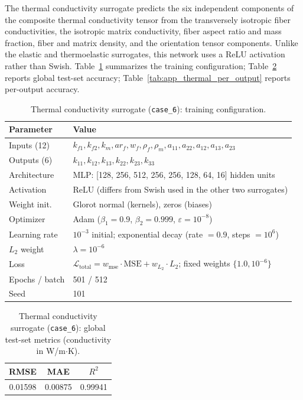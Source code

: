 \documentclass[preprint,review,10pt,number]{elsarticle}
\begin{document}
The thermal conductivity surrogate predicts the six independent components of the composite thermal conductivity tensor from the transversely isotropic fiber conductivities, the isotropic matrix conductivity, fiber aspect ratio and mass fraction, fiber and matrix density, and the orientation tensor components. Unlike the elastic and thermoelastic surrogates, this network uses a ReLU activation rather than Swish. Table~\ref{tab:app_thermal_config} summarizes the training configuration; Table~\ref{tab:app_thermal_global} reports global test-set accuracy; Table~\ref{tab:app_thermal_per_output} reports per-output accuracy.

\begin{table}[h]
\centering
\caption{Thermal conductivity surrogate (\texttt{case\_6}): training configuration.}
\label{tab:app_thermal_config}
\begin{tabular}{ll}
\toprule
Parameter & Value \\
\midrule
Inputs (12)     & $k_{f1}, k_{f2}, k_m, ar_f, w_f, \rho_f, \rho_m, a_{11}, a_{22}, a_{12}, a_{13}, a_{23}$ \\
Outputs (6)     & $k_{11}, k_{12}, k_{13}, k_{22}, k_{23}, k_{33}$ \\
Architecture    & MLP: [128, 256, 512, 256, 256, 128, 64, 16] hidden units \\
Activation      & ReLU (differs from Swish used in the other two surrogates) \\
Weight init.    & Glorot normal (kernels), zeros (biases) \\
Optimizer       & Adam ($\beta_1 = 0.9$, $\beta_2 = 0.999$, $\varepsilon = 10^{-8}$) \\
Learning rate   & $10^{-3}$ initial; exponential decay (rate $= 0.9$, steps $= 10^{6}$) \\
$L_2$ weight    & $\lambda = 10^{-6}$ \\
Loss            & $\mathcal{L}_{\text{total}} = w_{\text{mse}} \cdot \text{MSE} + w_{L_2} \cdot L_2$; fixed weights $\{1.0, 10^{-6}\}$ \\
Epochs / batch  & 501 / 512 \\
Seed            & 101 \\
\bottomrule
\end{tabular}
\end{table}

\begin{table}[h]
\centering
\caption{Thermal conductivity surrogate (\texttt{case\_6}): global
test-set metrics (conductivity in W/m$\cdot$K).}
\label{tab:app_thermal_global}
\begin{tabular}{ccc}
\toprule
RMSE & MAE & $R^2$ \\
\midrule
0.01598 & 0.00875 & 0.99941 \\
\bottomrule
\end{tabular}
\end{table}
\end{document}
